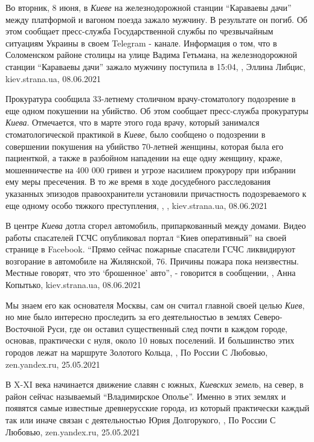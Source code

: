 Во вторник, 8 июня, в \emph{Киеве} на железнодорожной станции
\enquote{Караваевы дачи} между платформой и вагоном поезда зажало мужчину. В
результате он погиб.  Об этом сообщает пресс-служба Государственной службы по
чрезвычайным ситуациям Украины в своем Telegram - канале.  Информация о том,
что в Соломенском районе столицы на улице Вадима Гетьмана, на железнодорожной
станции \enquote{Караваевы дачи} зажало мужчину поступила в 15:04,
, Эллина Либцис, kiev.strana.ua, 08.06.2021

Прокуратура сообщила 33-летнему столичном врачу-стоматологу подозрение в еще
одном покушении на убийство.  Об этом сообщает пресс-служба прокуратуры
\emph{Киева}.  Отмечается, что в марте этого года врачу, который занимался
стоматологической практикой в \emph{Киеве}, было сообщено о подозрении в
совершении покушения на убийство 70-летней женщины, которая была его
пациенткой, а также в разбойном нападении на еще одну женщину, краже,
мошенничестве на 400 000 гривен и угрозе насилием прокурору при избрании ему
меры пресечения.  В то же время в ходе досудебного расследования указанных
эпизодов правоохранители установили причастность подозреваемого к еще одному
особо тяжкого преступления,
, , kiev.strana.ua, 08.06.2021

В центре \emph{Киева} дотла сгорел автомобиль, припаркованный между домами.  Видео
работы спасателей ГСЧС опубликовал портал \enquote{Киев оперативный} на своей
странице в Facebook.  \enquote{Прямо сейчас пожарные спасатели ГСЧС ликвидируют
возгорание в автомобиле на Жилянской, 76. Причины пожара пока неизвестны.
Местные говорят, что это \enquote{брошенное} авто}, - говорится в сообщении,
, Анна Копытько, kiev.strana.ua, 08.06.2021

Мы знаем его как основателя Москвы, сам он считал главной своей целью
\emph{Киев}, но мне было интересно проследить за его деятельностью в землях
Северо-Восточной Руси, где он оставил существенный след почти в каждом городе,
основав, практически с нуля, около 10 новых поселений. И большинство этих
городов лежат на маршруте Золотого Кольца,
, По России С Любовью, zen.yandex.ru, 25.05.2021

В X-XI века начинается движение славян с южных, \emph{Киевских земель}, на
север, в район сейчас называемый \enquote{Владимирское Ополье}. Именно в этих
землях и появятся самые известные древнерусские города, из который практически
каждый так или иначе связан с деятельностью Юрия Долгорукого,
, По России С Любовью, zen.yandex.ru, 25.05.2021

